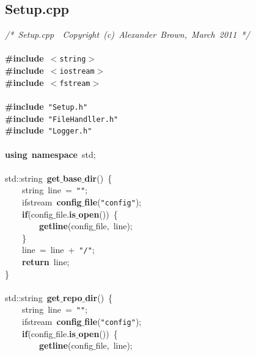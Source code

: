\subsection{Setup.cpp}
\scriptsize
\sffamily
\noindent
\mbox{}\textit{/*\ Setup.cpp\ \ Copyright\ (c)\ Alexander\ Brown,\ March\ 2011\ */} \\
\mbox{} \\
\mbox{}\textbf{\#include}\ \texttt{$<$string$>$} \\
\mbox{}\textbf{\#include}\ \texttt{$<$iostream$>$} \\
\mbox{}\textbf{\#include}\ \texttt{$<$fstream$>$} \\
\mbox{} \\
\mbox{}\textbf{\#include}\ \texttt{"{}Setup.h"{}} \\
\mbox{}\textbf{\#include}\ \texttt{"{}FileHandller.h"{}} \\
\mbox{}\textbf{\#include}\ \texttt{"{}Logger.h"{}} \\
\mbox{} \\
\mbox{}\textbf{using}\ \textbf{namespace}\ std; \\
\mbox{} \\
\mbox{}std::string\ \textbf{get$\_$base$\_$dir}()\ \{ \\
\mbox{}\ \ \ \ string\ line\ =\ \texttt{"{}"{}}; \\
\mbox{}\ \ \ \ ifstream\ \textbf{config$\_$file}(\texttt{"{}config"{}}); \\
\mbox{}\ \ \ \ \textbf{if}(config$\_$file.\textbf{is$\_$open}())\ \{ \\
\mbox{}\ \ \ \ \ \ \ \ \textbf{getline}(config$\_$file,\ line); \\
\mbox{}\ \ \ \ \} \\
\mbox{}\ \ \ \ line\ =\ line\ +\ \texttt{"{}/"{}}; \\
\mbox{}\ \ \ \ \textbf{return}\ line; \\
\mbox{}\} \\
\mbox{} \\
\mbox{}std::string\ \textbf{get$\_$repo$\_$dir}()\ \{ \\
\mbox{}\ \ \ \ string\ line\ =\ \texttt{"{}"{}}; \\
\mbox{}\ \ \ \ ifstream\ \textbf{config$\_$file}(\texttt{"{}config"{}}); \\
\mbox{}\ \ \ \ \textbf{if}(config$\_$file.\textbf{is$\_$open}())\ \{ \\
\mbox{}\ \ \ \ \ \ \ \ \textbf{getline}(config$\_$file,\ line); \\
